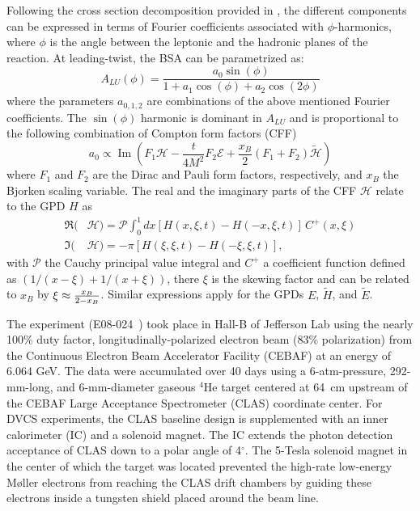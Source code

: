 \documentclass[twocolumn,nofootinbib,showpacs,prl,superscriptaddress,secnumarabic,amssymb,nobibnotes,aps,floatfix]{revtex4}
\begin{document}
Following the cross section decomposition provided in \cite{Belitsky:2001ns}, 
the different components can be expressed in terms of Fourier coefficients 
associated with $\phi$-harmonics, where $\phi$ is the angle between the 
leptonic and the hadronic planes of the reaction. At leading-twist, the BSA can 
be parametrized as: 
\begin{equation}
   A_{LU}(\phi) = \frac{a_{0}\sin(\phi)}{1+a_{1}\cos(\phi)+a_{2}\cos(2\phi)}
   \label{eq:alu-simp}
\end{equation}
where the parameters $a_{0,1,2}$ are combinations of the above mentioned Fourier 
coefficients. The $\sin(\phi)$ harmonic is dominant in $A_{LU}$ 
and is proportional to the following combination of Compton form factors (CFF) 
\cite{Guidal:2013rya}
\begin{equation}
   a_{0} \propto \operatorname{Im}( F_1 \mathcal{H}- \frac{t}{4M^2} F_2 
   \mathcal{E}+ \frac{x_B}{2}(F_1+F_2)\tilde{\mathcal{H}})
\end{equation}
where $F_1$ and $F_2$ are the Dirac and Pauli form factors, respectively, and 
$x_B$ the Bjorken scaling variable. The real and the imaginary parts of the CFF 
$\mathcal{H}$ relate to the GPD $H$ as  \begin{align}
   \Re(&\mathcal{H}) = \mathcal{P} \int_{0}^{1}dx[H(x,\xi,t)-H(-x,\xi,t)] \, 
   C^{+}(x,\xi) \\
   \Im(&\mathcal{H}) = - \pi [H(\xi,\xi,t)-H(-\xi,\xi,t)],
\end{align}
with $\mathcal{P}$ the Cauchy principal value integral and $C^{+}$ a 
coefficient function defined as $(1/(x-\xi) + 1/(x+\xi))$, there $\xi$ is the 
skewing factor and can be related to $x_B$ by $\xi\approx {{x_B}\over{2-x_B}}$.  
Similar expressions apply for the GPDs $E$, $\widetilde{H}$, and 
$\widetilde{E}$.


The experiment (E08-024~\cite{Hafidi:2008pr}) took place in Hall-B of Jefferson 
Lab using the nearly 100\% duty factor, longitudinally-polarized electron beam 
(83$\%$ polarization) from the Continuous Electron Beam Accelerator Facility 
(CEBAF) at an energy of 6.064 GeV. The data were accumulated over 
40 days using a 6-atm-pressure, 292-mm-long, and 6-mm-diameter gaseous $^4$He 
target centered at 64~cm upstream of the CEBAF Large Acceptance Spectrometer 
(CLAS) coordinate center. For DVCS experiments, the CLAS baseline design 
\cite{Mecking:2003zu} is supplemented with an inner calorimeter (IC) and a 
solenoid magnet. The IC extends the photon detection acceptance of CLAS down 
to a polar angle of 4$^{\circ}$. The 5-Tesla solenoid magnet in the center of 
which the target was located prevented the high-rate low-energy M{\o}ller 
electrons from reaching the CLAS drift chambers by guiding these electrons 
inside a tungsten shield placed around the beam line. 
\end{document}
